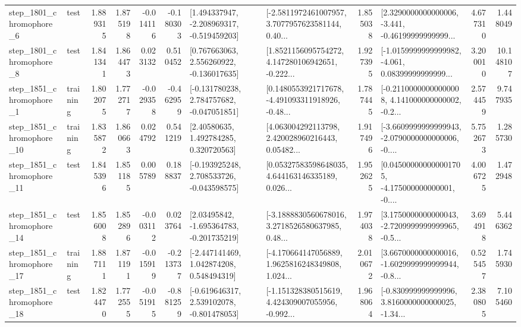 \begin{tabular}{llrrrrllrlrr}
  step\_1801\_chromophore\_6 &      test &      1.889315 &    1.875198 &     -0.014116 & -0.180303 &   [1.494337947, -2.208969317, -0.519459203] &  [-2.5811972461007957, 3.7077957623581144, 0.40... &       1.855038 &  [2.3290000000000006, -3.441, -0.46199999999999... &            4.677310 &          1.448049 \\
  step\_1801\_chromophore\_8 &      test &      1.841341 &    1.864473 &      0.023132 &  0.510452 &    [0.767663063, 2.556260922, -0.136017635] &  [1.8521156095754272, 4.147280106942651, -0.222... &       1.927395 &  [-1.0159999999999982, -4.061, 0.08399999999999... &            3.200010 &         10.148107 \\
  step\_1851\_chromophore\_1 &  training &      1.802075 &    1.772717 &     -0.029358 & -0.462959 &   [-0.131780238, 2.784757682, -0.047051851] &  [0.1480553921717678, -4.491093311918926, -0.48... &       1.787445 &  [-0.21100000000000008, 4.141000000000002, -0.2... &            2.574459 &          9.747935 \\
 step\_1851\_chromophore\_10 &  training &      1.835872 &    1.860663 &      0.024792 &  0.541219 &      [2.40580635, 1.492784285, 0.320720563] &  [4.063004292113798, 2.420028960216443, 0.05482... &       1.917496 &  [-3.6609999999999943, -2.0790000000000006, -0.... &            5.752673 &          1.285730 \\
 step\_1851\_chromophore\_11 &      test &      1.845396 &    1.851185 &      0.005789 &  0.188837 &   [-0.193925248, 2.708533726, -0.043598575] &  [0.05327583598648035, 4.644163146335189, 0.026... &       1.952625 &  [0.045000000000001705, -4.175000000000001, -0.... &            4.006725 &          1.472948 \\
 step\_1851\_chromophore\_14 &      test &      1.856008 &    1.852896 &     -0.003112 &  0.023764 &    [2.03495842, -1.695364783, -0.201735219] &  [-3.1888830560678016, 3.2718526580637985, 0.48... &       1.974038 &  [3.1750000000000043, -2.7209999999999965, -0.5... &            3.694918 &          5.446362 \\
 step\_1851\_chromophore\_17 &  training &      1.887111 &    1.871191 &     -0.015919 & -0.213737 &    [-2.447141469, 1.042874208, 0.548494319] &  [-4.170664147056889, 1.9625816248349808, 1.024... &       2.010672 &  [3.6670000000000016, -1.6029999999999944, -0.8... &            0.525457 &          1.745930 \\
 step\_1851\_chromophore\_18 &      test &      1.824470 &    1.772555 &     -0.051915 & -0.881259 &   [-0.619646317, 2.539102078, -0.801478053] &  [-1.151328380515619, 4.424309007055956, -0.992... &       1.968064 &  [-0.830999999999996, 3.8160000000000025, -1.34... &            2.380805 &          7.105460 \\

\end{tabular}
